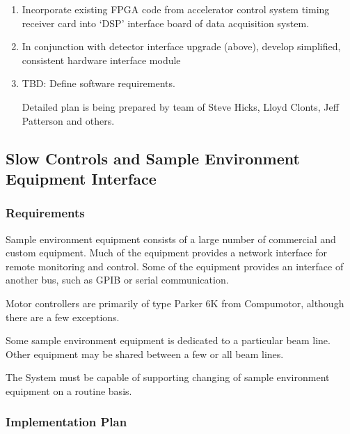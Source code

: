 \begin{enumerate}

\item Incorporate existing FPGA code from accelerator control system
timing receiver card into `DSP' interface board of data acquisition
system.

\item In conjunction with detector interface upgrade (above), develop
simplified, consistent hardware interface module

\item TBD: Define software requirements.

Detailed plan is being prepared by team of Steve Hicks, Lloyd Clonts,
Jeff Patterson and others.

\end{enumerate}

\subsection{Slow Controls and Sample Environment Equipment Interface}
\subsubsection{Requirements}

Sample environment equipment consists of a large number of commercial
and custom equipment. Much of the equipment provides a network interface
for remote monitoring and control. Some of the equipment provides an
interface of another bus, such as GPIB or serial communication.

Motor controllers are primarily of type Parker 6K from Compumotor,
although there are a few exceptions.

Some sample environment equipment is dedicated to a particular beam line.
Other equipment may be shared between a few or all beam lines.

The System must be capable of supporting changing of sample environment
equipment on a routine basis.

\subsubsection{Implementation Plan}

